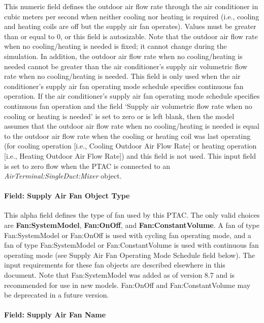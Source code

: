 This numeric field defines the outdoor air flow rate through the air conditioner in cubic meters per second when neither cooling nor heating is required (i.e., cooling and heating coils are off but the supply air fan operates). Values must be greater than or equal to 0, or this field is autosizable. Note that the outdoor air flow rate when no cooling/heating is needed is fixed; it cannot change during the simulation. In addition, the outdoor air flow rate when no cooling/heating is needed cannot be greater than the air conditioner's supply air volumetric flow rate when no cooling/heating is needed. This field is only used when the air conditioner's supply air fan operating mode schedule specifies continuous fan operation. If the air conditioner's supply air fan operating mode schedule specifies continuous fan operation and the field `Supply air volumetric flow rate when no cooling or heating is needed' is set to zero or is left blank, then the model assumes that the outdoor air flow rate when no cooling/heating is needed is equal to the outdoor air flow rate when the cooling or heating coil was last operating (for cooling operation {[}i.e., Cooling Outdoor Air Flow Rate{]} or heating operation {[}i.e., Heating Outdoor Air Flow Rate{]}) and this field is not used. This input field is set to zero flow when the PTAC is connected to an \textit{AirTerminal:SingleDuct:Mixer} object.

\paragraph{Field: Supply Air Fan Object Type}\label{field-supply-air-fan-object-type-5}

This alpha field defines the type of fan used by this PTAC. The only valid choices are \textbf{Fan:SystemModel}, \textbf{Fan:OnOff}, and \textbf{Fan:ConstantVolume}. A fan of type Fan:SystemModel or Fan:OnOff is used with cycling fan operating mode, and a fan of type Fan:SystemModel or Fan:ConstantVolume is used with continuous fan operating mode (see Supply Air Fan Operating Mode Schedule field below). The input requirements for these fan objects are described elsewhere in this document. Note that Fan:SystemModel was added as of version 8.7 and is recommended for use in new models.  Fan:OnOff and Fan:ConstantVolume may be deprecated in a future version.

\paragraph{Field: Supply Air Fan Name}\label{field-supply-air-fan-name-4}

